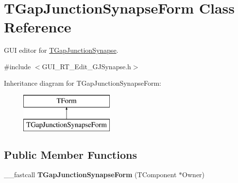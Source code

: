 \hypertarget{class_t_gap_junction_synapse_form}{\section{T\+Gap\+Junction\+Synapse\+Form Class Reference}
\label{class_t_gap_junction_synapse_form}
}


G\+U\+I editor for \hyperlink{class_t_gap_junction_synapse}{T\+Gap\+Junction\+Synapse}.  




{\ttfamily \#include $<$G\+U\+I\+\_\+\+R\+T\+\_\+\+Edit\+\_\+\+G\+J\+Synapse.\+h$>$}

Inheritance diagram for T\+Gap\+Junction\+Synapse\+Form\+:\begin{figure}[H]
\begin{center}
\leavevmode
\includegraphics[height=2.000000cm]{class_t_gap_junction_synapse_form}
\end{center}
\end{figure}
\subsection*{Public Member Functions}
\begin{DoxyCompactItemize}
\item 
\hypertarget{class_t_gap_junction_synapse_form_a4ee482a0f47eb61697dd235c4b2d0517}{\+\_\+\+\_\+fastcall {\bfseries T\+Gap\+Junction\+Synapse\+Form} (T\+Component $\ast$Owner)}\label{class_t_gap_junction_synapse_form_a4ee482a0f47eb61697dd235c4b2d0517}

\end{DoxyCompactItemize}
